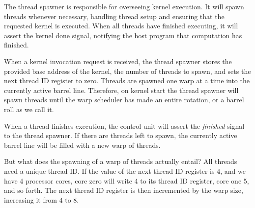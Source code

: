 The thread spawner is responsible for overseeing kernel execution.
It will spawn threads whenever necessary, handling thread setup and ensuring that the requested kernel is executed.
When all threads have finished executing, it will assert the kernel done signal, notifying the host program that computation has finished.

When a kernel invocation request is received, the thread spawner stores the provided base address of the kernel, the number of threads to spawn, and sets the next thread ID register to zero.
Threads are spawned one warp at a time into the currently active barrel line.
Therefore, on kernel start the thread spawner will spawn threads until the warp scheduler has made an entire rotation, or a barrel roll as we call it.

When a thread finishes execution, the control unit will assert the \emph{finished} signal to the thread spawner.
If there are threads left to spawn, the currently active barrel line will be filled with a new warp of threads.

But what does the spawning of a warp of threads actually entail?
All threads need a unique thread ID.
If the value of the next thread ID register is 4, and we have 4 processor cores,
core zero will write 4 to its thread ID register, core one 5, and so forth.
The next thread ID register is then incremented by the warp size, increasing it from 4 to 8.

